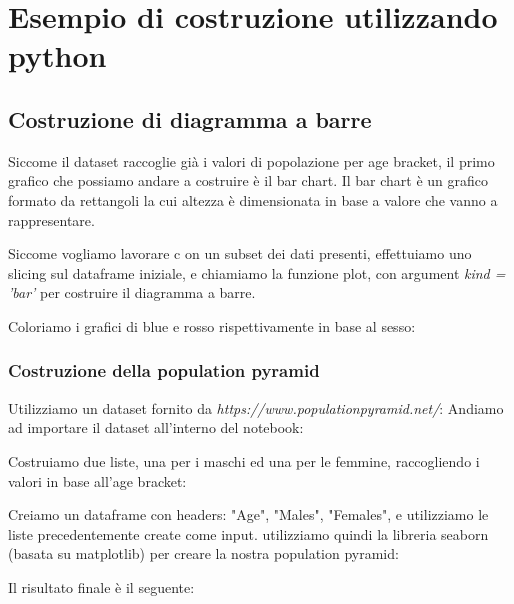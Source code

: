 \documentclass[11pt, oneside]{article}
\begin{document}
\section{Esempio di costruzione utilizzando python}

\subsection{Costruzione di diagramma a barre}
Siccome il dataset raccoglie già i valori di popolazione per age bracket, il primo grafico che possiamo andare a costruire è il bar chart. Il bar chart è un grafico formato da rettangoli la cui altezza è dimensionata in base a valore che vanno a rappresentare. 

Siccome vogliamo lavorare c on un subset dei dati presenti, effettuiamo uno slicing sul dataframe iniziale, e chiamiamo la funzione plot, con argument \emph{kind = 'bar'} per costruire il diagramma a barre.
\begin{center}
\end{center}
Coloriamo i grafici di blue e rosso rispettivamente in base al sesso:
\begin{center}
\end{center}

\subsubsection{Costruzione della population pyramid}
Utilizziamo un dataset fornito da \emph{https://www.populationpyramid.net/}:
Andiamo ad importare il dataset all'interno del notebook:
\begin{center}
\end{center}
Costruiamo due liste, una per i maschi ed una per le femmine, raccogliendo i valori in base all'age bracket:
\begin{center}
\end{center}
Creiamo un dataframe con headers: "Age", "Males", "Females", e utilizziamo le liste precedentemente create come input. utilizziamo quindi la libreria seaborn (basata su matplotlib) per creare la nostra population pyramid:
\begin{center}
\end{center}
Il risultato finale è il seguente:
\begin{center}
\end{center}
\end{document}
